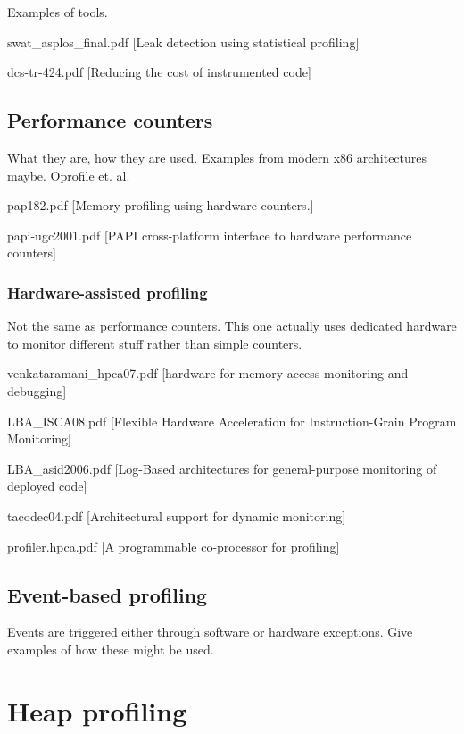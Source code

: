 Examples of tools.

swat\_asplos\_final.pdf [Leak detection using statistical profiling]

dcs-tr-424.pdf [Reducing the cost of instrumented code]

\subsection{Performance counters}
\label{subsection:performancecounters}

What they are, how they are used. Examples from modern x86 architectures maybe. Oprofile et. al.

pap182.pdf [Memory profiling using hardware counters.]

papi-ugc2001.pdf [PAPI cross-platform interface to hardware performance counters]

\subsubsection{Hardware-assisted profiling}
\label{subsubsection:hardwareassistedprofiling}

Not the same as performance counters. This one actually uses dedicated hardware to monitor different stuff rather than simple counters.

venkataramani\_hpca07.pdf [hardware for memory access monitoring and debugging]

LBA\_ISCA08.pdf [Flexible Hardware Acceleration for Instruction-Grain Program Monitoring]

LBA\_asid2006.pdf [Log-Based architectures for general-purpose monitoring of deployed code]

tacodec04.pdf [Architectural support for dynamic monitoring]

profiler.hpca.pdf [A programmable co-processor for profiling]

\subsection{Event-based profiling}
\label{subsection:eventbasedprofiling}

Events are triggered either through software or hardware exceptions. Give examples of how these might be used.

\section{Heap profiling}
\label{section:heapprofiling}

